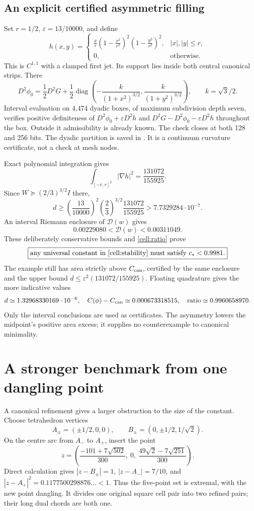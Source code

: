 \documentclass[11pt]{article}
\theoremstyle{remark}\newtheorem{remark}[theorem]{Remark}
\newcommand{\Dir}{\mathcal D}
\begin{document}
\subsection{An explicit certified asymmetric filling}
Set $r=1/2$, $\varepsilon=13/10000$, and define
\[
 h(x,y)=\begin{cases}
 \displaystyle\frac{x}{r}\left(1-\frac{x^2}{r^2}\right)^2
                        \left(1-\frac{y^2}{r^2}\right)^2,& |x|,|y|\leq r,\\
 0,&\text{otherwise}.
 \end{cases}
\]
This is $C^{1,1}$ with a clamped first jet. Its support lies inside both central canonical strips. There
\[
 D^2\phi_0=\frac12D^2G+\frac12
 \operatorname{diag}\left(-\frac{k}{(1+x^2)^{3/2}},
                          \frac{k}{(1+y^2)^{3/2}}\right),\qquad k=\sqrt3/2.
\]
Interval evaluation on 4,474 dyadic boxes, of maximum subdivision depth seven, verifies positive definiteness of
$D^2\phi_0+\varepsilon D^2h$ and $D^2G-D^2\phi_0-\varepsilon D^2h$ throughout the box. Outside it admissibility is already known. The check closes at both 128 and 256 bits. The dyadic partition is saved in . It is a continuum curvature certificate, not a check at mesh nodes.

Exact polynomial integration gives
\[
 \int_{[-r,r]^2}|\nabla h|^2=\frac{131072}{155925}.
\]
Since $W\succeq(2/3)^{3/2}I$ there,
\[
 d\geq\left(\frac{13}{10000}\right)^2
       \left(\frac23\right)^{3/2}\frac{131072}{155925}
       >7.7329284\cdot10^{-7}.
\]
An interval Riemann enclosure of $\Dir(w)$ gives
\[
 0.00229080<\Dir(w)<0.00311049.
\]
These deliberately conservative bounds and \eqref{cell:ratio} prove
\begin{equation}\label{cell:smoothcupper}
 \boxed{\text{any universal constant in \eqref{cell:stability} must satisfy }c_*<0.9981.}
\end{equation}
The example still has area strictly above $C_{\rm can}$, certified by the same enclosure and the upper bound $d\leq\varepsilon^2(131072/155925)$.
Floating quadrature gives the more indicative values
\[
 d\simeq1.32968330169\cdot10^{-6},\quad
 C(\phi)-C_{\rm can}\simeq0.000673318515,\quad
 \text{ratio}\simeq0.9960658970.
\]
Only the interval conclusions are used as certificates. The asymmetry lowers the midpoint's positive area excess; it supplies no counterexample to canonical minimality.

\section{A stronger benchmark from one dangling point}\label{cell:benchmark}
A canonical refinement gives a larger obstruction to the size of the constant. Choose tetrahedron vertices
\[
 A_\pm=(\pm1/2,0,0),\qquad B_\pm=(0,\pm1/2,1/\sqrt2).
\]
On the centre arc from $A_-$ to $A_+$, insert the point
\[
 z=\left(\frac{-101+7\sqrt{502}}{300},\ 0,\
          \frac{49\sqrt2-7\sqrt{251}}{300}\right).
\]
Direct calculation gives $|z-B_\pm|=1$, $|z-A_-|=7/10$, and
$|z-A_+|^2=0.1177500298876\ldots<1$. Thus the five-point set is extremal, with the new point dangling. It divides one original square cell pair into two refined pairs; their long dual chords are both one.
\end{document}
